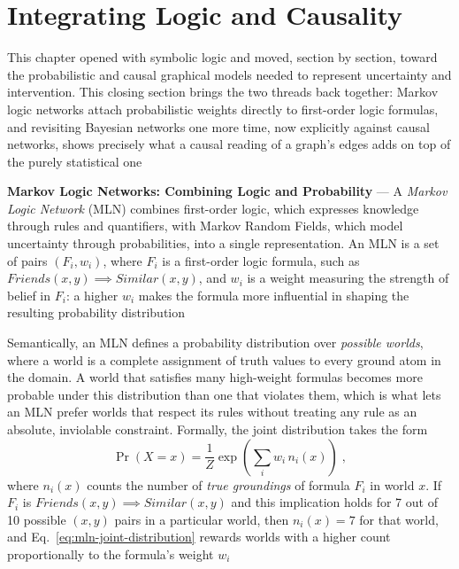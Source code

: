 \section{Integrating Logic and Causality}
\label{sec:integrating-logic-causality}

This chapter opened with symbolic logic and moved, section by section,
toward the probabilistic and causal graphical models needed to represent
uncertainty and intervention. This closing section brings the two threads
back together: Markov logic networks attach probabilistic weights directly
to first-order logic formulas, and revisiting Bayesian networks one more
time, now explicitly against causal networks, shows precisely what a
causal reading of a graph's edges adds on top of the purely statistical
one

\textbf{Markov Logic Networks: Combining Logic and Probability} --- A
\emph{Markov Logic Network} (MLN) combines first-order logic, which
expresses knowledge through rules and quantifiers, with Markov Random
Fields, which model uncertainty through probabilities, into a single
representation. An MLN is a set of pairs $(F_i, w_i)$, where $F_i$ is a
first-order logic formula, such as $Friends(x,y) \implies Similar(x,y)$,
and $w_i$ is a weight measuring the strength of belief in $F_i$: a higher
$w_i$ makes the formula more influential in shaping the resulting
probability distribution

Semantically, an MLN defines a probability distribution over
\emph{possible worlds}, where a world is a complete assignment of truth
values to every ground atom in the domain. A world that satisfies many
high-weight formulas becomes more probable under this distribution than
one that violates them, which is what lets an MLN prefer worlds that
respect its rules without treating any rule as an absolute, inviolable
constraint. Formally, the joint distribution takes the form
\begin{equation}
  \label{eq:mln-joint-distribution}
  \Pr(X = x) = \frac{1}{Z} \exp\left(\sum_i w_i\, n_i(x)\right)\;,
\end{equation}
where $n_i(x)$ counts the number of \emph{true groundings} of formula
$F_i$ in world $x$. If $F_i$ is $Friends(x,y) \implies Similar(x,y)$ and
this implication holds for 7 out of 10 possible $(x,y)$ pairs in a
particular world, then $n_i(x) = 7$ for that world, and
Eq.~\eqref{eq:mln-joint-distribution} rewards worlds with a higher count
proportionally to the formula's weight $w_i$

